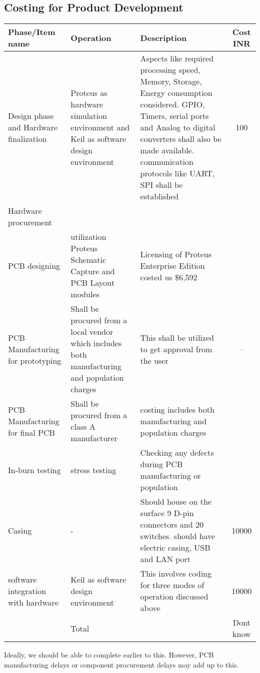 \documentclass{FR16}
\begin{document}
\newpage
\subsection{Costing for Product Development}
\begin{center}
\begin{tabular}{||p{3 cm} ||p{4 cm}|| p{6 cm}|| c|| }
\arrayrulecolor{Azzurro}
\hline
\hline

{\bfseries Phase/Item name } & {\bfseries Operation}& {\bfseries Description} & {\bfseries Cost INR} \\
\hline
\hline
Design phase and Hardware finalization& Proteus as hardware simulation environment and Keil as
software design environment &  Aspects like required  processing speed, Memory, Storage, Energy consumption considered. GPIO, Timers, serial ports and Analog to digital converters shall also be made available. communication protocols like UART, SPI shall be established &100\\
\hline
\hline
Hardware procurement & & &  \\
\hline
\hline
PCB designing & utilization Proteus Schematic Capture and PCB Layout modules  & Licensing of Proteus Enterprise Edition costed us \$6,592&\\ 
\hline 
\hline
PCB Manufacturing for prototyping & Shall be procured from a local vendor which includes both manufacturing and population charges & This shall be utilized to get approval from the user& --\\
\hline 
\hline
PCB Manufacturing for final PCB  & Shall be procured from a class A manufacturer & costing includes both manufacturing and population charges&\\
\hline 
\hline
In-burn testing & stress testing & Checking any defects during PCB manufacturing or population& \\
\hline 
\hline
Casing & - & Should house on the surface 9 D-pin connectors and 20 switches. should have electric casing, USB and LAN port & 10000\\
\hline
\hline
software integration with hardware &Keil as
software design environment & This involves coding for three modes of operation discussed above  & 10000\\
\hline
\hline
& Total & & Dont know
 
 \end{tabular}
\end{center}
Ideally, we should be able to complete earlier to this. However, PCB manufacturing delays or component procurement delays may add up to this.
\end{document}
